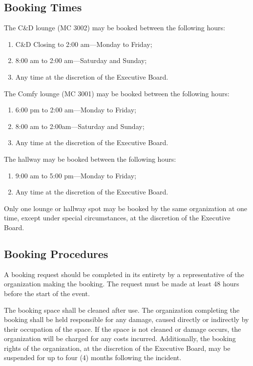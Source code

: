 \subsection{Booking Times}

The C\&D lounge (MC 3002) may be booked between the following hours:
\begin{enumerate}
  \item C\&D Closing to 2:00 am---Monday to Friday;
  \item 8:00 am to 2:00 am---Saturday and Sunday;
  \item Any time at the discretion of the Executive Board.
\end{enumerate}

The Comfy lounge (MC 3001) may be booked between the following hours:

\begin{enumerate}
  \item 6:00 pm to 2:00 am---Monday to Friday;
  \item 8:00 am to 2:00am---Saturday and Sunday;
  \item Any time at the discretion of the Executive Board.
\end{enumerate}

The hallway may be booked between the following hours:

\begin{enumerate}
  \item 9:00 am to 5:00 pm---Monday to Friday;
  \item Any time at the discretion of the Executive Board.
\end{enumerate}

Only one lounge or hallway spot may be booked by the same organization at one
time, except under special circumstances, at the discretion of the Executive
Board.

\subsection{Booking Procedures}

A booking request should be completed in its entirety by a representative of
the organization making the booking. The request must be made at least 48 hours
before the start of the event.

The booking space shall be cleaned after use. The organization completing the
booking shall be held responsible for any damage, caused directly or indirectly
by their occupation of the space. If the space is not cleaned or damage occurs,
the organization will be charged for any costs incurred. Additionally, the
booking rights of the organization, at the discretion of the Executive Board,
may be suspended for up to four (4) months following the incident.


